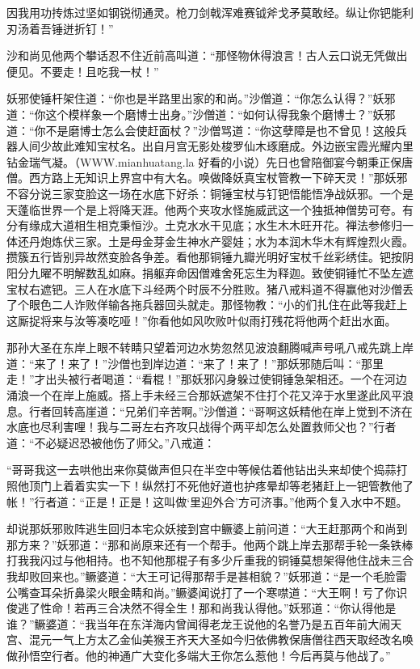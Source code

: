 \documentclass[12pt,UTF8]{ctexbook}
\begin{document}
因我用功抟炼过坚如钢锐彻通灵。枪刀剑戟浑难赛钺斧戈矛莫敢经。纵让你钯能利刃汤着吾锤迸折钉！”

沙和尚见他两个攀话忍不住近前高叫道：“那怪物休得浪言！古人云口说无凭做出便见。不要走！且吃我一杖！”

妖邪使锤杆架住道：“你也是半路里出家的和尚。”沙僧道：“你怎么认得？”妖邪道：“你这个模样象一个磨博士出身。”沙僧道：“如何认得我象个磨博士？”妖邪道：“你不是磨博士怎么会使赶面杖？”沙僧骂道：“你这孽障是也不曾见！这般兵器人间少故此难知宝杖名。出自月宫无影处梭罗仙木琢磨成。外边嵌宝霞光耀内里钻金瑞气凝。（WWW.mianhuatang.la 好看的小说）先日也曾陪御宴今朝秉正保唐僧。西方路上无知识上界宫中有大名。唤做降妖真宝杖管教一下碎天灵！”那妖邪不容分说三家变脸这一场在水底下好杀：铜锤宝杖与钉钯悟能悟净战妖邪。一个是天蓬临世界一个是上将降天涯。他两个夹攻水怪施威武这一个独抵神僧势可夸。有分有缘成大道相生相克秉恒沙。土克水水干见底；水生木木旺开花。禅法参修归一体还丹炮炼伏三家。土是母金芽金生神水产婴娃；水为本润木华木有辉煌烈火霞。攒簇五行皆别异故然变脸各争差。看他那铜锤九瓣光明好宝杖千丝彩绣佳。钯按阴阳分九曜不明解数乱如麻。捐躯弃命因僧难舍死忘生为释迦。致使铜锤忙不坠左遮宝杖右遮钯。三人在水底下斗经两个时辰不分胜败。猪八戒料道不得赢他对沙僧丢了个眼色二人诈败佯输各拖兵器回头就走。那怪物教：“小的们扎住在此等我赶上这厮捉将来与汝等凑吃哑！”你看他如风吹败叶似雨打残花将他两个赶出水面。

那孙大圣在东岸上眼不转睛只望着河边水势忽然见波浪翻腾喊声号吼八戒先跳上岸道：“来了！来了！”沙僧也到岸边道：“来了！来了！”那妖邪随后叫：“那里走！”才出头被行者喝道：“看棍！”那妖邪闪身躲过使铜锤急架相还。一个在河边涌浪一个在岸上施威。搭上手未经三合那妖遮架不住打个花又淬于水里遂此风平浪息。行者回转高崖道：“兄弟们辛苦啊。”沙僧道：“哥啊这妖精他在岸上觉到不济在水底也尽利害哩！我与二哥左右齐攻只战得个两平却怎么处置救师父也？”行者道：“不必疑迟恐被他伤了师父。”八戒道：

“哥哥我这一去哄他出来你莫做声但只在半空中等候估着他钻出头来却使个捣蒜打照他顶门上着着实实一下！纵然打不死他好道也护疼晕却等老猪赶上一钯管教他了帐！”行者道：“正是！正是！这叫做‘里迎外合’方可济事。”他两个复入水中不题。

却说那妖邪败阵逃生回归本宅众妖接到宫中鳜婆上前问道：“大王赶那两个和尚到那方来？”妖邪道：“那和尚原来还有一个帮手。他两个跳上岸去那帮手轮一条铁棒打我我闪过与他相持。也不知他那棍子有多少斤重我的铜锤莫想架得他住战未三合我却败回来也。”鳜婆道：“大王可记得那帮手是甚相貌？”妖邪道：“是一个毛脸雷公嘴查耳朵折鼻梁火眼金睛和尚。”鳜婆闻说打了一个寒噤道：“大王啊！亏了你识俊逃了性命！若再三合决然不得全生！那和尚我认得他。”妖邪道：“你认得他是谁？”鳜婆道：“我当年在东洋海内曾闻得老龙王说他的名誉乃是五百年前大闹天宫、混元一气上方太乙金仙美猴王齐天大圣如今归依佛教保唐僧往西天取经改名唤做孙悟空行者。他的神通广大变化多端大王你怎么惹他！今后再莫与他战了。”
\end{document}
